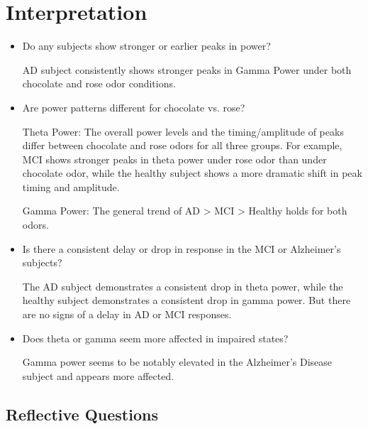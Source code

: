 \documentclass[hidelinks,12pt]{article}
\begin{document}
	\section{Interpretation}
	\begin{itemize}
		\item Do any subjects show stronger or earlier peaks in power?
		
		AD subject consistently shows stronger peaks in Gamma Power under both chocolate and rose odor conditions.
		
		\item Are power patterns different for chocolate vs. rose?
		
		Theta Power: The overall power levels and the timing/amplitude of peaks differ between chocolate and rose odors for all three groups. For example, MCI shows stronger peaks in theta power under rose odor than under chocolate odor, while the healthy subject shows a more dramatic shift in peak timing and amplitude.
		
		Gamma Power: The general trend of AD > MCI > Healthy holds for both odors.
		
		\item Is there a consistent delay or drop in response in the MCI or Alzheimer's subjects?
		
		The AD subject demonstrates a consistent drop in theta power, while the healthy subject demonstrates a consistent drop in gamma power. But there are no signs of a delay in AD or MCI responses.
		
		\item Does theta or gamma seem more affected in impaired states?
		
		Gamma power seems to be notably elevated in the Alzheimer's Disease subject and appears more affected.
	\end{itemize}
	
	\subsection{Reflective Questions}
	
\end{document}
